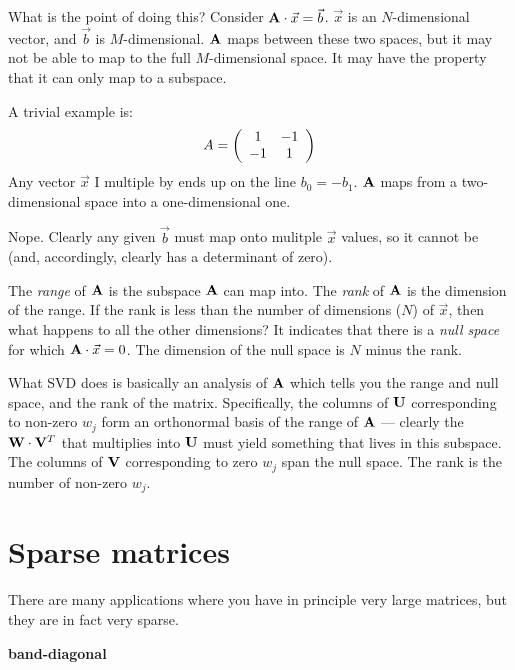 What is the point of doing this? Consider ${\bf A}\cdot\vec{x} =
\vec{b}$. $\vec{x}$ is an $N$-dimensional vector, and $\vec{b}$ is
$M$-dimensional. ${\bf A}$ maps between these two spaces, but it may
not be able to map to the full $M$-dimensional space.  It may have the
property that it can only map to a subspace.

A trivial example is:
\begin{equation}
  A = \left(\begin{array}{cc}
    1 & -1\cr
    -1 & 1
    \end{array}\right)
\end{equation}
Any vector $\vec{x}$ I multiple by ends up on the line $b_0 =
-b_1$. ${\bf A}$ maps from a two-dimensional space into a
one-dimensional one.


\begin{answer}
  Nope. Clearly any given $\vec{b}$ must map onto mulitple $\vec{x}$
  values, so it cannot be (and, accordingly, clearly has a determinant
  of zero).
\end{answer}

The {\it range} of ${\bf A}$ is the subspace ${\bf A}$ can map
into. The {\it rank} of ${\bf A}$ is the dimension of the range.  If
the rank is less than the number of dimensions ($N$) of $\vec{x}$,
then what happens to all the other dimensions? It indicates that there
is a {\it null space} for which $ {\bf A}\cdot \vec{x} = 0$. The
dimension of the null space is $N$ minus the rank.

What SVD does is basically an analysis of ${\bf A}$ which tells you
the range and null space, and the rank of the matrix. Specifically,
the columns of ${\bf U}$ corresponding to non-zero $w_j$ form an
orthonormal basis of the range of ${\bf A}$ --- clearly the ${\bf
  W}\cdot{\bf V}^T$ that multiplies into ${\bf U}$ must yield
something that lives in this subspace. The columns of ${\bf V}$
corresponding to zero $w_j$ span the null space.  The rank is the
number of non-zero $w_j$. 

\section{Sparse matrices}

There are many applications where you have in principle very large
matrices, but they are in fact very sparse.  

{\bf band-diagonal}
